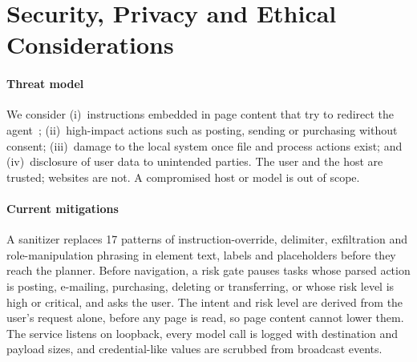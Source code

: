 \section{Security, Privacy and Ethical Considerations}
\label{sec:security}

\paragraph{Threat model} We consider (i)~instructions embedded in page content that try to redirect the agent~\cite{greshake2023indirect}; (ii)~high-impact actions such as posting, sending or purchasing without consent; (iii)~damage to the local system once file and process actions exist; and (iv)~disclosure of user data to unintended parties. The user and the host are trusted; websites are not. A compromised host or model is out of scope.

\paragraph{Current mitigations} A sanitizer replaces 17 patterns of instruction-override, delimiter, exfiltration and role-manipulation phrasing in element text, labels and placeholders before they reach the planner. Before navigation, a risk gate pauses tasks whose parsed action is posting, e-mailing, purchasing, deleting or transferring, or whose risk level is high or critical, and asks the user. The intent and risk level are derived from the user's request alone, before any page is read, so page content cannot lower them. The service listens on loopback, every model call is logged with destination and payload sizes, and credential-like values are scrubbed from broadcast events.

